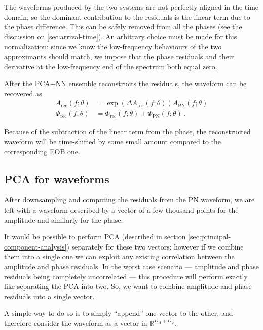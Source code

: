 \documentclass[main.tex]{subfiles}
\begin{document}
The waveforms produced by the two systems are not perfectly aligned in the time domain, so the dominant contribution to the residuals is the linear term due to the phase difference. This can be safely removed from all the phases (see the discussion on \ref{sec:arrival-time}). 
An arbitrary choice must be made for this normalization: since we know the low-frequency behaviours of the two approximants should match, we impose that the phase residuals and their derivative at the low-frequency end of the spectrum both equal zero.

After the \ac{PCA}+\ac{NN} ensemble reconstructs the residuals, the waveform can be recovered as 
%
\begin{subequations}\label{eq:amplitude-phase-reconstruction}
\begin{align}
A _{\text{rec}} (f; \theta ) &= \exp( \Delta A _{\text{rec}} (f; \theta )) A _{\text{PN}}(f; \theta )  \\
\Phi _{\text{rec}} (f; \theta ) &= \Phi _{\text{rec}}(f; \theta ) + \Phi _{\text{PN}}(f; \theta )
\,.
\end{align}
\end{subequations}

Because of the subtraction of the linear term from the phase, the reconstructed waveform will be time-shifted by some small amount compared to the corresponding \ac{EOB} one. 

\subsection{PCA for waveforms}

After downsampling and computing the residuals from the \ac{PN} waveform, we are left with a waveform described by a vector of a few thousand points for the amplitude and similarly for the phase. 

It would be possible to perform \ac{PCA} (described in section \ref{sec:principal-component-analysis}) separately for these two vectors; however if we combine them into a single one we can exploit any existing correlation between the amplitude and phase residuals. 
In the worst case scenario --- amplitude and phase residuals being completely uncorrelated --- this procedure will perform exactly like separating the \ac{PCA} into two. 
So, we want to combine amplitude and phase residuals into a single vector. 

A simple way to do so is to simply ``append'' one vector to the other, and therefore consider the waveform as a vector in \(\mathbb{R}^{D_A + D_\varphi }\). 
\end{document}
